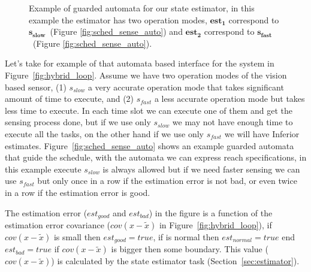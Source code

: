 \documentclass[11pt]{article}
\begin{document}
\begin{figure}[]
    \centering
    
    
    \caption{Example of guarded automata for our state estimator, in this example the estimator has two operation modes, $\mathbf{est_1}$ correspond to $\mathbf{s_{slow}}$~(Figure \ref{fig:sched_sense_auto}) and $\mathbf{est_2}$ correspond to $\mathbf{s_{fast}}$~(Figure \ref{fig:sched_sense_auto}).
    \label{fig:sched_estimator_auto}}
\end{figure}

Let's take for example of that automata based interface for the system in Figure~\ref{fig:hybrid_loop}.
Assume we have two operation modes of the vision based sensor, (1) $s_{slow}$ a very accurate operation mode that takes significant amount of time to execute, 
and (2) $s_{fast}$ a less accurate operation mode but takes less time to execute.
In each time slot we can execute one of them and get the sensing process done, but if we use only $s_{slow}$ we may not have enough time to execute all the tasks, on the other hand if we use only $s_{fast}$ we will have Inferior estimates.
Figure~\ref{fig:sched_sense_auto} shows an example guarded automata that guide the schedule, with the automata we can express reach specifications, in this example execute $s_{slow}$ is always allowed but if we need faster sensing we can use $s_{fast}$ but only once in a row if the estimation error is not bad, or even twice in a row if the estimation error is good.

The estimation error ($est_{good}$ and $est_{bad}$) in the figure is a function of the estimation error covariance ($cov(x-\tilde{x})$ in Figure~\ref{fig:hybrid_loop}), if $cov(x-\tilde{x})$ is small then $est_{good} = true$, if is normal then $est_{normal} = true$ end $est_{bad} = true$ if $cov(x-\tilde{x})$ is  bigger then some boundary.
This value ($cov(x-\tilde{x})$) is calculated by the state estimator task (Section~\ref{sec:estimator}).
\end{document}
